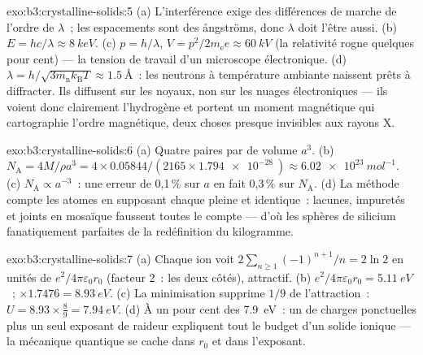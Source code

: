 \begin{solution}{exo:b3:crystalline-solids:5}
(a) L'interférence exige des différences de marche de l'ordre de
$\lambda$~; les espacements sont des ångströms, donc $\lambda$ doit
l'être aussi. (b) $E =
hc/\lambda \approx \qty{8}{keV}$. (c) $p = h/\lambda$, $V =
p^2/2m_{\text{e}}e \approx \qty{60}{kV}$ (la relativité rogne
quelques pour cent) --- la tension de travail d'un microscope
électronique. (d)
$\lambda = h/\sqrt{3m_{\text{n}}k_{\text{B}}T} \approx
\qty{1.5}{\angstrom}$~: les neutrons à température ambiante naissent
prêts à diffracter. Ils diffusent sur les noyaux, non sur les nuages
électroniques --- ils voient donc clairement l'hydrogène et portent
un moment magnétique qui cartographie l'ordre magnétique, deux
choses presque invisibles aux rayons X.
\end{solution}

\begin{solution}{exo:b3:crystalline-solids:6}
(a) Quatre paires par  de volume $a^3$. (b) $N_{\text{A}} =
4M/\rho a^3 = 4\times0.05844/(2165\times\qty{1.794e-28}{})
\approx \qty{6.02e23}{mol^{-1}}$. (c) $N_{\text{A}} \propto
a^{-3}$~: une erreur de 0,1\,\% sur $a$ en fait 0,3\,\% sur
$N_{\text{A}}$. (d) La méthode compte les atomes en supposant chaque
 pleine et identique~: lacunes, impuretés et joints en
mosaïque faussent toutes le compte --- d'où les sphères de silicium
fanatiquement parfaites de la redéfinition du kilogramme.
\end{solution}

\begin{solution}{exo:b3:crystalline-solids:7}
(a) Chaque ion voit $2\sum_{n\ge1}(-1)^{n+1}/n = 2\ln2$ en unités de
$e^2/4\pi\varepsilon_0r_0$ (facteur 2~: les deux côtés), attractif.
(b) $e^2/4\pi\varepsilon_0r_0 = \qty{5.11}{eV}$~; $\times1.7476 =
\qty{8.93}{eV}$. (c) La minimisation supprime $1/9$ de
l'attraction~: $U = 8.93\times\tfrac89 = \qty{7.94}{eV}$. (d) À un
pour cent des \qty{7.9}{eV}~: un  de charges ponctuelles plus
un seul exposant de raideur expliquent tout le budget d'un solide
ionique --- la mécanique quantique se cache dans $r_0$ et dans
l'exposant.
\end{solution}

